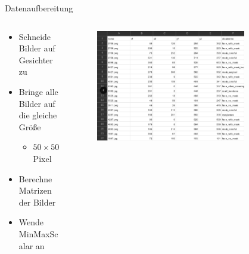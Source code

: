 \documentclass[aspectratio=1610, 9pt]{beamer}
\begin{document}
\begin{frame}{Datenaufbereitung}
  \begin{columns}
    \begin{column}{0.48\textwidth}
      \begin{itemize}
        \item Schneide Bilder auf Gesichter zu
        \item Bringe alle Bilder auf die gleiche Größe 
        \begin{itemize}
          \item $50 \times 50$ Pixel
        \end{itemize}
        \item Berechne Matrizen der Bilder
        \item Wende MinMaxScalar an
      \end{itemize}
    \end{column}
    \begin{column}{0.48\textwidth}
      \begin{figure}
        \centering
        \includegraphics[width = 0.8\textwidth]{images/Datensatz.png}
      \end{figure}
    \end{column}
  \end{columns}
\end{frame}
\end{document}
